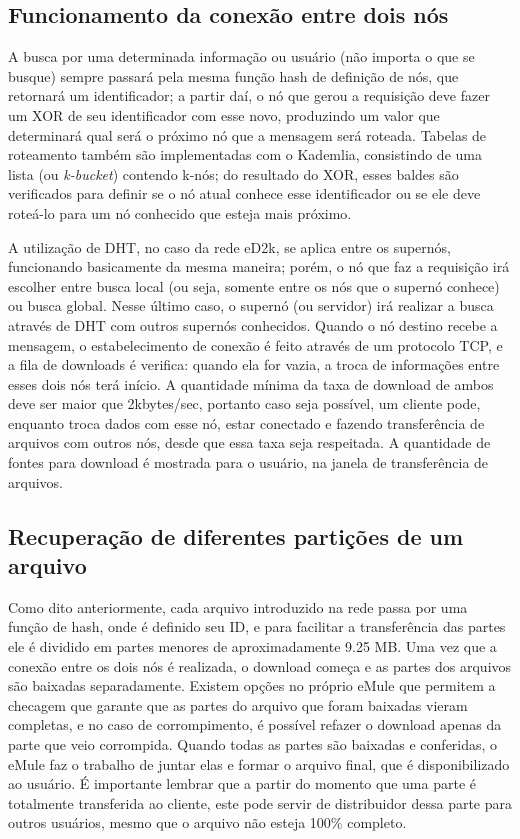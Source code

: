 \documentclass[a4paper]{article}
\begin{document}
    


	\subsection{Funcionamento da conexão entre dois nós}
		A busca por uma determinada informação ou usuário (não importa o que se busque) sempre passará pela mesma função hash de 
definição de nós, que retornará um identificador; a partir daí, o nó que gerou a requisição deve fazer um XOR de seu identificador com 
esse novo, produzindo um valor que determinará qual será o próximo nó que a mensagem será roteada. Tabelas de roteamento também são 
implementadas com o Kademlia, consistindo de uma lista (ou \textit{k-bucket}) contendo k-nós; do resultado do XOR, esses baldes são 
verificados para definir se o nó atual conhece esse identificador ou se ele deve roteá-lo para um nó conhecido que esteja mais próximo.

		A  utilização de DHT, no caso da rede eD2k, se aplica entre os supernós, funcionando basicamente da mesma maneira; porém, 
o nó que faz a requisição irá escolher entre busca local (ou seja, somente entre os nós que o supernó conhece) ou busca global. Nesse 
último caso, o supernó (ou servidor) irá realizar a busca através de DHT com outros supernós conhecidos. Quando o nó destino recebe a 
mensagem, o estabelecimento de conexão é feito através de um protocolo TCP, e a fila de downloads é verifica: quando ela for vazia, a 
troca de informações entre esses dois nós terá início. A quantidade mínima da taxa de download de ambos deve ser maior que 2kbytes/sec, 
portanto caso seja possível, um cliente pode, enquanto troca dados com esse nó, estar conectado e fazendo transferência de arquivos com 
outros nós, desde que essa taxa seja respeitada. A quantidade de fontes para download é mostrada para o usuário, na janela de 
transferência de arquivos.

	\subsection{Recuperação de diferentes partições de um arquivo}
    	Como dito anteriormente, cada arquivo introduzido na rede passa por uma função de hash, onde é definido seu ID, e para facilitar a transferência das partes ele é dividido em partes menores de aproximadamente 9.25 MB. 
        Uma vez que a conexão entre os dois nós é realizada, o download começa e as partes dos arquivos são baixadas separadamente.
        Existem opções no próprio eMule que permitem a checagem que garante que as partes do arquivo que foram baixadas vieram completas, e no caso de corrompimento, é possível refazer o download apenas da parte que veio corrompida. Quando todas as partes são baixadas e conferidas, o eMule faz o trabalho de juntar elas e formar o arquivo final, que é disponibilizado ao usuário. É importante lembrar que a partir do momento que uma parte é totalmente transferida ao cliente, este pode servir de distribuidor dessa parte para outros usuários, mesmo que o arquivo não esteja 100\% completo.
        
\end{document}
